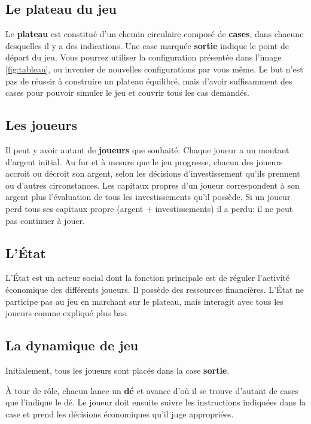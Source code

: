 \documentclass[12pt]{article}
\begin{document}
    \subsection{Le plateau du jeu}
    Le \textbf{plateau} est constitué d'un chemin circulaire composé de \textbf{cases},
dans chacune desquelles il y a des indications. Une case marquée \textbf{sortie}
indique le point de départ du jeu.
Vous pourrez utiliser la configuration présentée dans l'image \autoref{fig:tableau}, ou inventer de nouvelles configurations par vous même. 
Le but n'est pas de réussir à construire un plateau équilibré, mais d'avoir suffisamment des cases pour pouvoir simuler le jeu et couvrir tous les cas demandés.
	
    \subsection{Les joueurs}
   
    Il peut y avoir autant de \textbf{joueurs} que souhaité. Chaque joueur a un
montant d'argent initial. Au fur et à mesure que le jeu progresse, chacun des joueurs accroit
ou décroit son argent, selon les décisions d'investissement qu'ils prennent ou d'autres
circonstances. Les capitaux propres d'un joueur correspondent à
son argent plus l'évaluation de tous les investissements qu'il possède.
Si un joueur perd tous ses capitaux propre (argent + investissements) il a perdu: il ne peut pas continuer à jouer.
    
    \subsection{L'\'Etat}
    
    L'\'Etat est un acteur social dont la fonction principale est de réguler l'activité économique des
différents joueurs. Il possède des ressources financières. L'État ne participe pas
au jeu en marchant sur le plateau, mais interagit avec tous les joueurs comme expliqué plus bas.

    \subsection{La dynamique de jeu}
    
    Initialement, tous les joueurs sont placés dans la case \textbf{sortie}. 

À tour de rôle, chacun lance un \textbf{dé} et avance d'où il se trouve d'autant de cases que l'indique le dé. 
Le joueur doit ensuite suivre les instructions indiquées dans la case et prend les décisions économiques qu'il juge appropriées.
    
\end{document}
